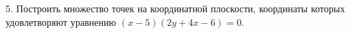 5. Построить множество точек на координатной плоскости, координаты которых удовлетворяют уравнению $(x-5)(2y+4x-6)=0.$\\
